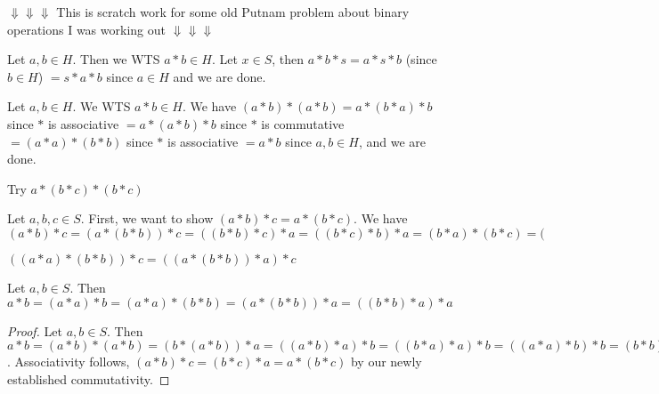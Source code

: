 $\Downarrow \Downarrow \Downarrow$ This is scratch work for some old Putnam problem about binary operations I was working out $\Downarrow \Downarrow \Downarrow$

Let $a,b\in H$. Then we WTS  $a*b\in H$. Let  $x\in S$, then $a*b*s=a*s*b$ (since $b\in H$) $=s*a*b$ since $a\in H$ and we are done.

Let $a,b\in H$. We WTS $a*b\in H$. We have $(a*b)*(a*b)=a*(b*a)*b$ since $*$ is associative  $=a*(a*b)*b$ since $*$ is commutative $=(a*a)*(b*b)$ since $*$ is associative $=a*b$ since $a,b \in H$, and we are done.

Try $a*(b*c)*(b*c)$

Let $a,b,c\in S$. First, we want to show $(a*b)*c=a*(b*c)$. We have $(a*b)*c=(a*(b*b))*c=((b*b)*c)*a=((b*c)*b)*a=(b*a)*(b*c)=($

$((a*a)*(b*b))*c=((a*(b*b))*a)*c$

Let $a,b\in S$. Then $a*b=(a*a)*b=(a*a)*(b*b)=(a*(b*b))*a=((b*b)*a)*a$
\begin{proof}
Let $a,b\in S$. Then $a*b=(a*b)*(a*b)=(b*(a*b))*a=((a*b)*a)*b=((b*a)*a)*b=((a*a)*b)*b=(b*b)*(a*a)=b*a$. Associativity follows, $(a*b)*c=(b*c)*a=a*(b*c)$ by our newly established commutativity.
\end{proof}

